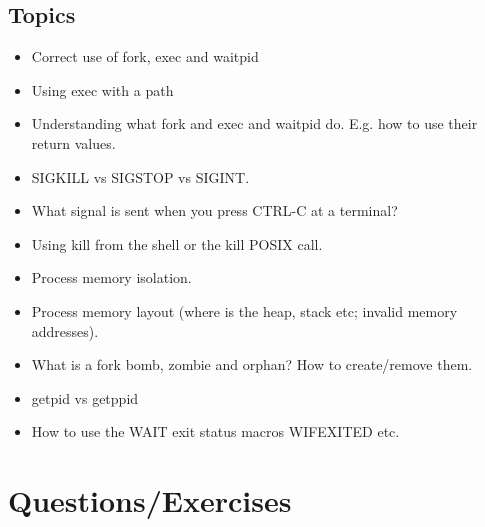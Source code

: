 \subsection{Topics}

\begin{itemize}
\item Correct use of fork, exec and waitpid
\item Using exec with a path
\item Understanding what fork and exec and waitpid do. E.g. how to use their return values.
\item SIGKILL vs SIGSTOP vs SIGINT.
\item What signal is sent when you press CTRL-C at a terminal?
\item Using kill from the shell or the kill POSIX call.
\item Process memory isolation.
\item Process memory layout (where is the heap, stack etc; invalid memory addresses).
\item What is a fork bomb, zombie and orphan? How to create/remove them.
\item getpid vs getppid
\item How to use the WAIT exit status macros WIFEXITED etc.
\end{itemize}

\section{Questions/Exercises}

